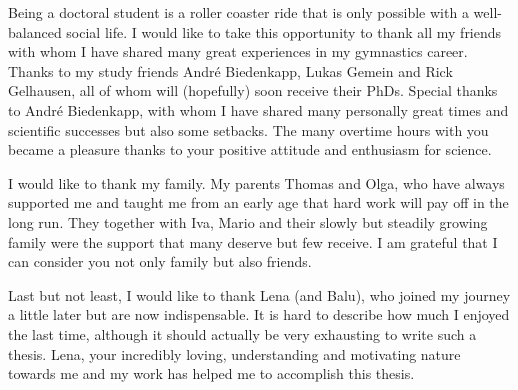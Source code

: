 Being a doctoral student is a roller coaster ride that is only possible with a well-balanced social life. 
I would like to take this opportunity to thank all my friends with whom I have shared many great experiences in my gymnastics career. 
Thanks to my study friends Andr{\'e} Biedenkapp, Lukas Gemein and Rick Gelhausen, all of whom will (hopefully) soon receive their PhDs. 
Special thanks to Andr{\'e} Biedenkapp, with whom I have shared many personally great times and scientific successes but also some setbacks.
The many overtime hours with you became a pleasure thanks to your positive attitude and enthusiasm for science.

I would like to thank my family. 
My parents Thomas and Olga, who have always supported me and taught me from an early age that hard work will pay off in the long run. 
They together with Iva, Mario and their slowly but steadily growing family were the support that many deserve but few receive. 
I am grateful that I can consider you not only family but also friends.

Last but not least, I would like to thank Lena (and Balu), who joined my journey a little later but are now indispensable. 
It is hard to describe how much I enjoyed the last time, although it should actually be very exhausting to write such a thesis. 
Lena, your incredibly loving, understanding and motivating nature towards me and my work has helped me to accomplish this thesis.

\vfill{}

